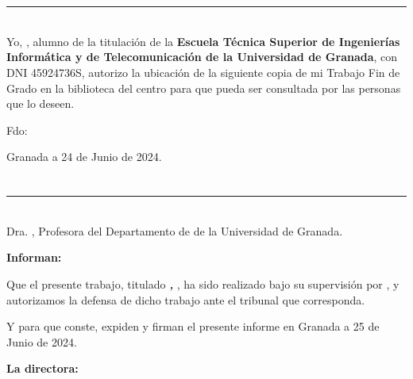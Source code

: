 \chapter*{}
\thispagestyle{empty}


\noindent\rule[-1ex]{\textwidth}{2pt}\\[4.5ex]

Yo, \textbf{\myName}, alumno de la titulación \myDegree de la \textbf{Escuela Técnica Superior
de Ingenierías Informática y de Telecomunicación de la Universidad de Granada}, con DNI 45924736S, autorizo la
ubicación de la siguiente copia de mi Trabajo Fin de Grado en la biblioteca del centro para que pueda ser
consultada por las personas que lo deseen.

\vspace{6cm}

\noindent Fdo: \myName

\vspace{2cm}

\begin{flushright}
Granada a 24 de Junio de 2024.
\end{flushright}


\chapter*{}
\thispagestyle{empty}

\noindent\rule[-1ex]{\textwidth}{2pt}\\[4.5ex]

Dra. \textbf{\myProf}, Profesora del Departamento de \myDepartment de la Universidad de Granada.


\vspace{0.5cm}

\textbf{Informan:}

\vspace{0.5cm}

Que el presente trabajo, titulado \textit{\textbf{\myTitle, \mySubTitle}},
ha sido realizado bajo su supervisión por \textbf{\myName}, y autorizamos la defensa de dicho trabajo ante el tribunal que corresponda.

\vspace{0.5cm}

Y para que conste, expiden y firman el presente informe en Granada a 25 de Junio de 2024.

\vspace{1cm}

\textbf{La directora:}

\vspace{5cm}

